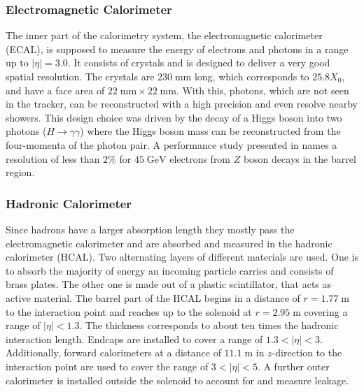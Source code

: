 \subsubsection{Electromagnetic Calorimeter}
	The inner part of the calorimetry system, the electromagnetic calorimeter (ECAL), is supposed to measure the energy of electrons and photons in a range up to $|\eta| = 3.0$. It consists of  crystals and is designed to deliver a very good spatial resolution. The crystals are $230\;\text{mm}$ long, which corresponds to $25.8 X_0$, and have a face area of $22\;\text{mm} \times 22\;\text{mm}$. With this, photons, which are not seen in the tracker, can be reconstructed with a high precision and even resolve nearby showers. This design choice was driven by the decay of a Higgs boson into two photons ($H\rightarrow \gamma \gamma$) where the Higgs boson mass can be reconstructed from the four-momenta of the photon pair. A performance study presented in \cite{EGammaPerformance} names a resolution of less than $2\%$ for $45\;\text{GeV}$ electrons from $Z$ boson decays in the barrel region.

\subsubsection{Hadronic Calorimeter}
	Since hadrons have a larger absorption length they mostly pass the electromagnetic calorimeter and are absorbed and measured in the hadronic calorimeter (HCAL). Two alternating layers of different materials are used. One is to absorb the majority of energy an incoming particle carries and consists of brass plates. The other one is made out of a plastic scintillator, that acts as active material. The barrel part of the HCAL begins in a distance of $r=1.77\;\text{m}$ to the interaction point and reaches up to the solenoid at $r=2.95\;\text{m}$ covering a range of $|\eta| < 1.3$. The thickness corresponds to about ten times the hadronic interaction length. Endcaps are installed to cover a range of $1.3 < |\eta| < 3$. Additionally, forward calorimeters at a distance of $11.1\;\text{m}$ in $z$-direction to the interaction point are used to cover the range of $3 < |\eta| < 5$. A further outer calorimeter is installed outside the solenoid to account for and measure leakage.
 
